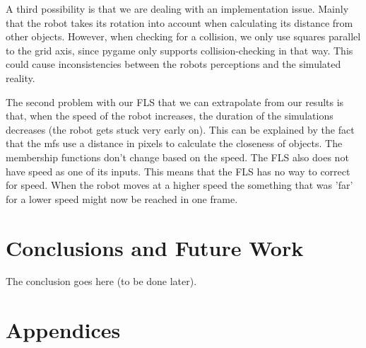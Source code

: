 \documentclass[conference]{IEEEtran}
\begin{document}
A third possibility is that we are dealing with an implementation issue. Mainly that the robot takes its rotation into account when calculating its distance from other objects. However, when checking for a collision, we only use squares parallel to the grid axis, since pygame only supports collision-checking in that way. This could cause inconsistencies between the robots perceptions and the simulated reality.

The second problem with our FLS that we can extrapolate from our results is that, when the speed of the robot increases, the duration of the simulations decreases (the robot gets stuck very early on). This can be explained by the fact that the mfs use a distance in pixels to calculate the closeness of objects. The membership functions don't change based on the speed. The FLS also does not have speed as one of its inputs. This means that the FLS has no way to correct for speed. When the robot moves at a higher speed the something that was 'far' for a lower speed might now be reached in one frame.


\section{Conclusions and Future Work}
The conclusion goes here (to be done later).










\nocite{*}




\newpage

\section{Appendices}
\end{document}
